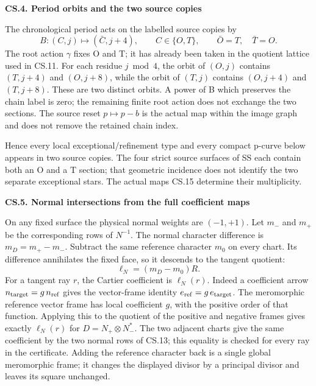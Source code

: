 \par

\medskip\noindent\textbf{CS.4. Period orbits and the two source copies}

\par\nobreak

The chronological period acts on the labelled source
copies by
\[
 B:(C,j)\longmapsto(\bar C,j+4),\qquad
 C\in\{O,T\},\qquad \bar O=T,\quad\bar T=O.
 \tag{CS.15}
\]
The root action \(\gamma\) fixes O and T; it has
already been taken in the quotient lattice used in
CS.11. For each residue \(j\bmod4\), the orbit of
\((O,j)\) contains \((T,j+4)\) and \((O,j+8)\),
while the orbit of \((T,j)\) contains \((O,j+4)\)
and \((T,j+8)\). These are two distinct orbits.
A power of B which preserves the chain label is zero;
the remaining finite root action does not exchange
the two sections. The source reset \(p\mapsto p-b\)
is the actual map within the image graph and does
not remove the retained chain index.

Hence every local exceptional/refinement type and
every compact p-curve below appears in two source
copies. The four strict source surfaces of SS each
contain both an O and a T section; that geometric
incidence does not identify the two separate
exceptional stars. The actual maps CS.15 determine
their multiplicity.

\par

\medskip\noindent\textbf{CS.5. Normal intersections from the full coefficient maps}

\par\nobreak

On any fixed surface the physical normal weights are
\((-1,+1)\). Let \(m_-\) and \(m_+\) be the corresponding
rows of \(N^{-1}\). The normal character difference is
\(m_D=m_+-m_-\). Subtract the same reference character
\(m_0\) on every chart. Its difference annihilates the
fixed face, so it descends to the tangent quotient:
\[
 \ell_N=(m_D-m_0)R.
 \tag{CS.16}
\]
For a tangent ray \(r\), the Cartier coefficient is
\(\ell_N(r)\). Indeed a coefficient arrow
\(n_{\rm target}=g\,n_{\rm ref}\) gives the vector-frame
identity \(e_{\rm ref}=g\,e_{\rm target}\). The
meromorphic reference vector frame has local
coefficient \(g\), with the positive order of that
function. Applying this to the quotient of the
positive and negative frames gives exactly
\(\ell_N(r)\) for \(D=N_+\otimes N_-^*\).
The two adjacent charts give the same coefficient
by the two normal rows of CS.13; this equality is
checked for every ray in the certificate.
Adding the reference character back is a single
global meromorphic frame; it changes the displayed
divisor by a principal divisor and leaves its square
unchanged.

